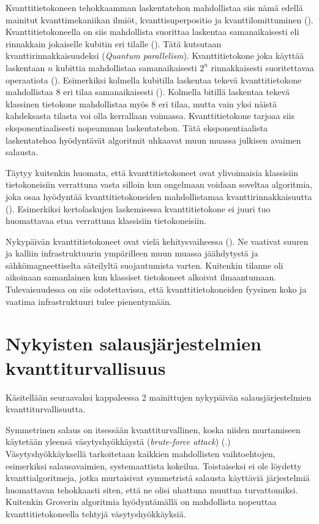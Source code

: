 Kvanttitietokoneen tehokkaamman laskentatehon mahdollistaa siis nämä edellä mainitut kvanttimekaniikan ilmiöt, kvanttisuperpositio ja kvanttilomittuminen (\cite{mavroeidis2018impact}). Kvanttitietokoneella on siis mahdollista suorittaa laskentaa samanaikaisesti eli rinnakkain jokaiselle kubitin eri tilalle (\cite{doi:10.1080/23742917.2016.1226650}). Tätä kutsutaan kvanttirinnakkaisuudeksi (\emph{Quantum parallelism}). Kvanttitietokone joka käyttää laskentaan $n$ kubittia mahdollistaa samanaikaisesti $2^{n}$ rinnakkaisesti suoritettavaa operaatiota (\cite{mavroeidis2018impact}). Esimerkiksi kolmella kubitilla laskentaa tekevä kvanttitietokone mahdollistaa 8 eri tilaa samanaikaisesti (\cite{doi:10.1080/23742917.2016.1226650}). Kolmella bitillä laskentaa tekevä klassinen tietokone mahdollistaa myös 8 eri tilaa, mutta vain yksi näistä kahdeksasta tilasta voi olla kerrallaan voimassa.  Kvanttitietokone tarjoaa siis eksponentiaalisesti nopeamman laskentatehon. Tätä eksponentiaalista laskentatehoa hyödyntävät algoritmit uhkaavat muun muassa julkisen avaimen salausta.

Täytyy kuitenkin huomata, että kvanttitietokoneet ovat ylivoimaisia klassisiin tietokoneisiin verrattuna vasta silloin kun ongelmaan voidaan soveltaa algoritmia, joka osaa hyödyntää kvanttitietokoneiden mahdollistamaa kvanttirinnakkaisuutta (\cite{mavroeidis2018impact}). Esimerkiksi kertolaskujen laskemisessa kvanttitietokone ei juuri tuo huomattavaa etua verrattuna klassisiin tietokoneisiin.

Nykypäivän kvanttitietokoneet ovat vielä kehitysvaiheessa (\cite{doi:10.1080/23742917.2016.1226650}). Ne vaativat suuren ja kalliin infrastruktuurin ympärilleen muun muassa jäähdytystä ja sähkömagneettiselta säteilyltä suojautumista varten. Kuitenkin tilanne oli aikoinaan samanlainen kun klassiset tietokoneet alkoivat ilmaantumaan. Tulevaisuudessa on siis odotettavissa, että kvanttitietokoneiden fyysinen koko ja vaatima infrastruktuuri tulee pienentymään.

\section{Nykyisten salausjärjestelmien kvanttiturvallisuus}
Käsitellään seuraavaksi kappaleessa 2 mainittujen nykypäivän salausjärjestelmien kvanttiturvallisuutta.

 Symmetrinen salaus on itsessään kvanttiturvallinen, koska niiden murtamiseen käytetään yleensä väsytyshyökkäystä (\emph{brute-force attack}) (\cite{mavroeidis2018impact}.) Väsytyshyökkäyksellä tarkoitetaan kaikkien mahdollisten vaihtoehtojen, esimerkiksi salausavaimien, systemaattista kokeilua. %
Toistaiseksi ei ole löydetty kvanttialgoritmeja, jotka murtaisivat symmetristä salausta käyttäviä järjestelmiä huomattavan tehokkaasti siten, että ne olisi uhattuna muuttua turvattomiksi. Kuitenkin Groverin algoritmia hyödyntämällä on mahdollista nopeuttaa kvanttitietokoneella tehtyjä väsytyshyökkäyksiä.
 
